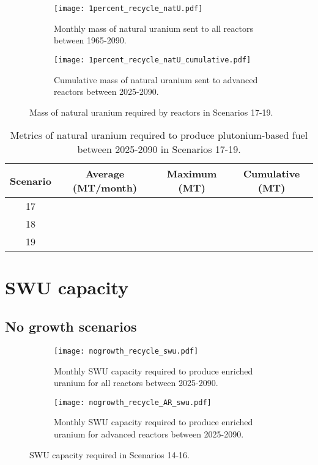 \begin{figure}[h!]
    \centering
    \begin{subfigure}[b]{0.45\textwidth}
        \centering
        \texttt{[image: 1percent\_recycle\_natU.pdf]}
        \caption{Monthly mass of natural uranium sent to all reactors 
        between 1965-2090.}
        \label{fig:1percent_recycle_AR_natu}
    \end{subfigure}
    \hfill
    \begin{subfigure}[b]{0.45\textwidth}
        \centering
        \texttt{[image: 1percent\_recycle\_natU\_cumulative.pdf]}
        \caption{Cumulative mass of natural uranium sent to 
        advanced reactors between 2025-2090.}
        \label{fig:1percent_recycle_natu_cumulative}
    \end{subfigure}
       \caption{Mass of natural uranium required by reactors
        in Scenarios 17-19.}
       \label{fig:1percent_recycle_uranium}
\end{figure}

\begin{table}[h!]
    \centering 
    \caption{Metrics of natural uranium required to produce 
    plutonium-based fuel between 2025-2090 in Scenarios 
    17-19.}
    \label{tab:natu_17-19}
    \begin{tabular}{c c c c}
        \hline 
        Scenario & Average (MT/month) & Maximum (MT) & Cumulative (MT) \\
        \hline
        17 &  &  & \\
        18 &  &  & \\
        19 &  &  & \\
        \hline
    \end{tabular}
\end{table}


\section{SWU capacity}
\subsection{No growth scenarios}

\begin{figure}[h!]
    \centering
    \begin{subfigure}[b]{0.45\textwidth}
        \centering
        \texttt{[image: nogrowth\_recycle\_swu.pdf]}
        \caption{Monthly SWU capacity required to produce 
        enriched uranium for all reactors between 2025-2090.}
        \label{fig:nogrowth_recycle_swu_all}
    \end{subfigure}
    \hfill
    \begin{subfigure}[b]{0.45\textwidth}
        \centering
        \texttt{[image: nogrowth\_recycle\_AR\_swu.pdf]}
        \caption{Monthly SWU capacity required to produce 
        enriched uranium for advanced reactors between 2025-2090.}
        \label{fig:nogrowth_recycle_swu_AR}
    \end{subfigure}
       \caption{\gls{SWU} capacity required in Scenarios 14-16.}
       \label{fig:nogrowth_recycle_swu}
\end{figure}


